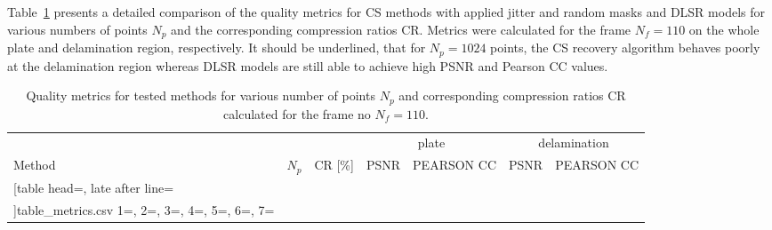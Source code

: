 Table~\ref{tab:csv_results} presents a detailed comparison of the quality metrics for CS methods with applied jitter and random masks and DLSR models for various numbers of points $N_p$ and the corresponding compression ratios CR.
Metrics were calculated for the frame $N_f=110$ on the whole plate and delamination region, respectively.
It should be underlined, that for $N_p=1024$ points, the CS recovery algorithm behaves poorly at the delamination region whereas DLSR models are still able to achieve high PSNR and Pearson CC values.
\begin{table}[!ht]
	\renewcommand{\arraystretch}{1.3}
	\centering \footnotesize
	\caption{Quality metrics for tested methods for various number of points $N_p$ and corresponding compression ratios CR calculated for the frame no $N_f=110$.}	
	\begin{tabular}{lrrrcrc} 
		\toprule
		& & & \multicolumn{2}{c}{plate} & \multicolumn{2}{c}{delamination} \\
		\cmidrule(lr){4-5} \cmidrule(lr){6-7}
		Method & $N_p$ & CR [\%] & PSNR & PEARSON CC& PSNR & PEARSON CC \\
		\midrule
		\csvreader
		[table head=\toprule,
		late after line=\\ 
		]{table_metrics.csv}{
		1=\one, 2=\two, 3=\three, 4=\four, 5=\five, 6=\six, 7=\seven
		}%
		{\one & \two & \three & \four & \five & \six & \seven }%
		\bottomrule
	\end{tabular}	
	\label{tab:csv_results}
\end{table}